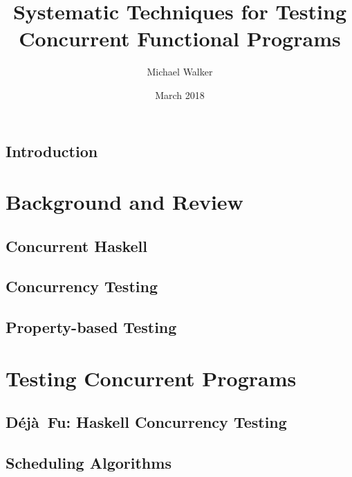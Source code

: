 \documentclass[openright,imperial,11pt]{octavo}
\title{Systematic Techniques for Testing Concurrent Functional Programs}
\author{Michael Walker}
\date{March 2018}
\newcommand{\dejafu}{D\'{e}j\`{a}~Fu}
\begin{document}
\pagestyle{plain}

\makeatletter\@openrightfalse\makeatother



\cleardoublepage

\makeatletter\@openrighttrue\makeatother

\pagestyle{headings}

\chapter{Introduction}
\label{chp:introduction}


\part{Background and Review}
\label{part:review}

\chapter{Concurrent Haskell}
\label{chp:concurrent_haskell}


\chapter{Concurrency Testing}
\label{chp:sct}


\chapter{Property-based Testing}
\label{chp:property_testing}


\part{Testing Concurrent Programs}
\label{part:testing}

\chapter{\dejafu{}: Haskell Concurrency Testing}
\label{chp:dejafu}


\chapter{Scheduling Algorithms}
\label{chp:algorithms}

\end{document}
